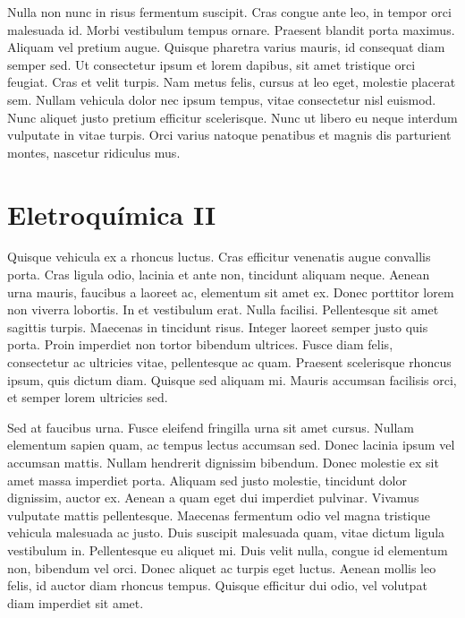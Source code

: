 \documentclass[12pt]{article}
\begin{document}
\begin{multicols*}{2}
        Nulla non nunc in risus fermentum suscipit. Cras congue ante leo, in tempor orci malesuada id. Morbi 
        vestibulum tempus ornare. Praesent blandit porta maximus. Aliquam vel pretium augue. Quisque pharetra 
        varius mauris, id consequat diam semper sed. Ut consectetur ipsum et lorem dapibus, sit amet tristique 
        orci feugiat. Cras et velit turpis. Nam metus felis, cursus at leo eget, molestie placerat sem. Nullam 
        vehicula dolor nec ipsum tempus, vitae consectetur nisl euismod. Nunc aliquet justo pretium efficitur 
        scelerisque. Nunc ut libero eu neque interdum vulputate in vitae turpis. Orci varius natoque penatibus 
        et magnis dis parturient montes, nascetur ridiculus mus. 
    

        \section{Eletroquímica II}

        Quisque vehicula ex a rhoncus luctus. Cras efficitur venenatis augue convallis porta. Cras ligula odio, 
        lacinia et ante non, tincidunt aliquam neque. Aenean urna mauris, faucibus a laoreet ac, elementum sit 
        amet ex. Donec porttitor lorem non viverra lobortis. In et vestibulum erat. Nulla facilisi.
         Pellentesque sit amet sagittis turpis. Maecenas in tincidunt risus. Integer laoreet semper justo quis 
         porta. Proin imperdiet non tortor bibendum ultrices. Fusce diam felis, consectetur ac ultricies vitae, 
         pellentesque ac quam. Praesent scelerisque rhoncus ipsum, quis dictum diam. Quisque sed aliquam mi.
         Mauris accumsan facilisis orci, et semper lorem ultricies sed.

        Sed at faucibus urna. Fusce eleifend fringilla urna sit amet cursus. Nullam elementum sapien quam, ac 
        tempus lectus accumsan sed. Donec lacinia ipsum vel accumsan mattis. Nullam hendrerit dignissim bibendum.
         Donec molestie ex sit amet massa imperdiet porta. Aliquam sed justo molestie, tincidunt dolor dignissim, 
         auctor ex. Aenean a quam eget dui imperdiet pulvinar. Vivamus vulputate mattis pellentesque. Maecenas 
         fermentum odio vel magna tristique vehicula malesuada ac justo. Duis suscipit malesuada quam, vitae 
         dictum ligula vestibulum in. Pellentesque eu aliquet mi. Duis velit nulla, congue id elementum non, 
         bibendum vel orci. Donec aliquet ac turpis eget luctus. Aenean mollis leo felis, id auctor diam rhoncus 
         tempus. Quisque efficitur dui odio, vel volutpat diam imperdiet sit amet. 


\end{multicols*}
\end{document}
